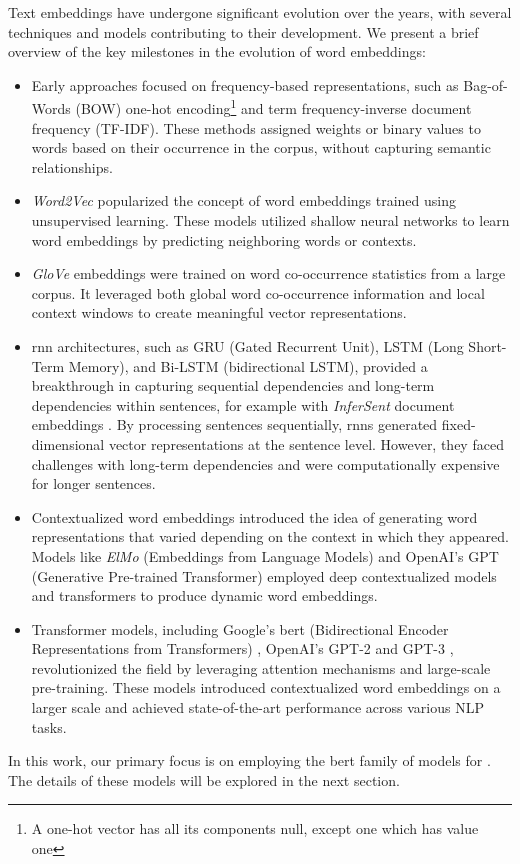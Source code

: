 Text embeddings have undergone significant evolution over the years, with several techniques and models contributing to their development. We present a brief overview of the key milestones in the evolution of word embeddings:

\begin{itemize}
    \item Early approaches focused on frequency-based representations, such as Bag-of-Words (BOW) one-hot encoding\footnote{A one-hot vector has all its components null, except one which has value one} and term frequency-inverse document frequency (TF-IDF). These methods assigned weights or binary values to words based on their occurrence in the corpus, without capturing semantic relationships.
    \item \emph{Word2Vec}  popularized the concept of word embeddings trained using unsupervised learning. These models utilized shallow neural networks to learn word embeddings by predicting neighboring words or contexts. 
    \item \emph{GloVe} embeddings   were trained on word co-occurrence statistics from a large corpus. It leveraged both global word co-occurrence information and local context windows to create meaningful vector representations.
    \item \gls{rnn} architectures, such as GRU (Gated Recurrent Unit), LSTM (Long Short-Term Memory),  and Bi-LSTM (bidirectional LSTM), provided a breakthrough in capturing sequential dependencies and long-term dependencies within sentences, for example with \emph{InferSent} document embeddings . By processing sentences sequentially, \gls{rnn}s generated fixed-dimensional vector representations at the sentence level. However, they faced challenges with long-term dependencies and were computationally expensive for longer sentences.
    
    \item  Contextualized word embeddings introduced the idea of generating word representations that varied depending on the context in which they appeared. Models like \emph{ElMo} (Embeddings from Language Models)  and OpenAI's GPT (Generative Pre-trained Transformer)  employed deep contextualized models and transformers to produce dynamic word embeddings.
    \item Transformer models, including Google's \gls{bert} (Bidirectional Encoder Representations from Transformers) 
    , OpenAI's GPT-2  and GPT-3 , revolutionized the field by leveraging attention mechanisms and large-scale pre-training. These models introduced contextualized word embeddings on a larger scale and achieved state-of-the-art performance across various NLP tasks. %
\end{itemize}


In this work, our primary focus is on employing the \gls{bert} family of models for \textclassification{}. The details of these models will be explored in the next section.
